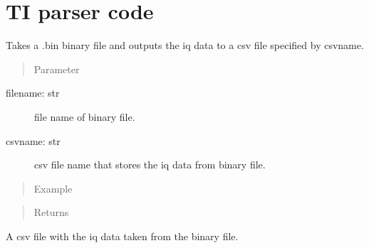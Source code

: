 \documentclass[letterpaper,10pt,english]{sphinxmanual}
\begin{document}
\section{TI parser code}
\label{\detokenize{TI radar:module-TI_parser}}\label{\detokenize{TI radar:ti-parser-code}}\label{\detokenize{TI radar::doc}}

\begin{fulllineitems}
\label{\detokenize{TI radar:TI_parser.readTIdata}}
Takes a .bin binary file and outputs the iq data to a csv file specified by csvname.
\begin{quote}\begin{description}
\item[{Parameter}] \leavevmode
\end{description}\end{quote}
\begin{description}
\item[{filename: str}] \leavevmode
file name of binary file.

\item[{csvname: str}] \leavevmode
csv file name that stores the iq data from binary file.

\end{description}
\begin{quote}\begin{description}
\item[{Example}] \leavevmode
\end{description}\end{quote}

\begin{sphinxVerbatim}[commandchars=\\\{\}]
\end{sphinxVerbatim}
\begin{quote}\begin{description}
\item[{Returns}] \leavevmode


\end{description}\end{quote}

A csv file with the iq data taken from the binary file.

\end{fulllineitems}
\end{document}
